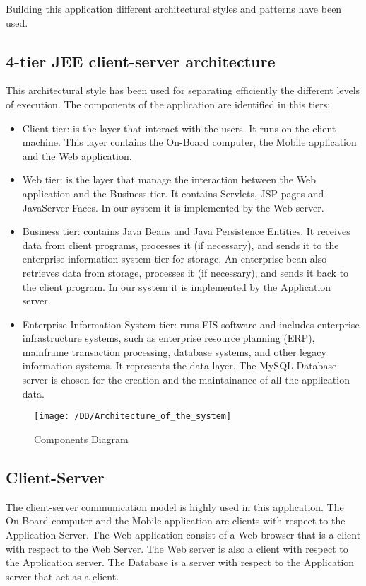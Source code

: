 Building this application different architectural styles and patterns have been used.
\subsection{4-tier JEE client-server architecture}
	This architectural style has been used for separating efficiently the different levels of execution. The components of the application are identified in this tiers:
	\begin{itemize}
		\item{Client tier: is the layer that interact with the users. It runs on the client machine. This layer contains the On-Board computer, the Mobile application and the Web application.}
		\item{Web tier: is the layer that manage the interaction between the Web application and the Business tier. It contains Servlets, JSP pages and JavaServer Faces. In our system it is implemented by the Web server.}%
		\item{Business tier: contains Java Beans and Java Persistence Entities. It receives data from client programs, processes it (if necessary), and sends it to the enterprise information system tier for storage. An enterprise bean also retrieves data from storage, processes it (if necessary), and sends it back to the client program. In our system it is implemented by the Application server.}
		\item{Enterprise Information System tier: runs EIS software and includes enterprise infrastructure systems, such as enterprise resource planning (ERP), mainframe transaction processing, database systems, and other legacy information systems. It represents the data layer. The MySQL Database server is chosen for the creation and the maintainance of all the application data.}
	\end{itemize}
	\begin{figure}[!ht]
  \centering
  \vspace{0.2cm}
  \texttt{[image: /DD/Architecture\_of\_the\_system]}\\
  \vspace{0.4cm}
  \caption{Components Diagram} 
  \label{fig:Architecture of the system} 
\end{figure}
\subsection{Client-Server}
	The client-server communication model is highly used in this application.
	The On-Board computer and the Mobile application are clients with respect to the Application Server. The Web application consist of a Web browser that is a client with respect to the Web Server. The Web server is also a client with respect to the Application server. The Database is a server with respect to the Application server that act as a client.
